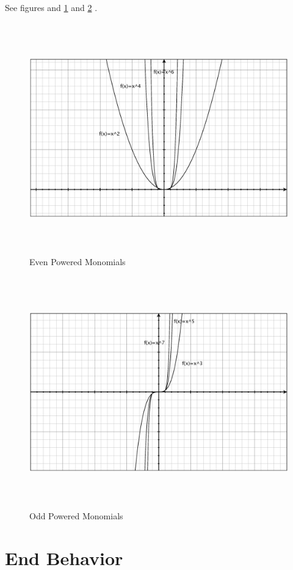 \documentclass[fleqn,addpoints]{exam}
\begin{document}
See figures and \ref{even} and \ref{odd} .

\begin{figure}[H]
  \centering
  \includegraphics[width=14cm,height=10cm]{even_powered_monomials.eps}
  \caption{Even Powered Monomials}
  \label{even}
\end{figure}

\begin{figure}[H]
  \centering
  \includegraphics[width=14cm,height=10cm]{odd_powered_monomials.eps}
  \caption{Odd Powered Monomials}
  \label{odd}
\end{figure}

\section{End Behavior}
\label{end_behavior}
\end{document}
